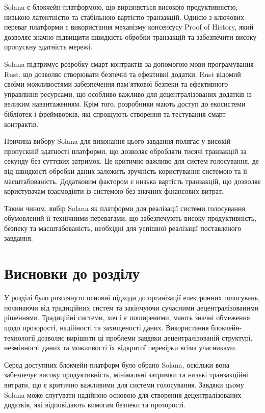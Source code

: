 \documentclass[14pt]{extreport}
\begin{document}
  Solana є блокчейн-платформою, що вирізняється високою продуктивністю, низькою латентністю та стабільною вартістю транзакцій. Однією з ключових переваг платформи є використання механізму консенсусу Proof of History, який дозволяє значно підвищити швидкість обробки транзакцій та забезпечити високу пропускну здатність мережі.

  Solana підтримує розробку смарт-контрактів за допомогою мови програмування Rust, що дозволяє створювати безпечні та ефективні додатки. Rust відомий своїми можливостями забезпечення пам’яткової безпеки та ефективного управління ресурсами, що особливо важливо для децентралізованих додатків із великим навантаженням. Крім того, розробники мають доступ до екосистеми бібліотек і фреймворків, які спрощують створення та тестування смарт-контрактів.

  Причина вибору Solana для виконання цього завдання полягає у високій пропускній здатності платформи, що дозволяє обробляти тисячі транзакцій за секунду без суттєвих затримок. Це критично важливо для систем голосування, де від швидкості обробки даних залежить зручність користування системою та її масштабованість. Додатковим фактором є низька вартість транзакцій, що дозволяє користувачам взаємодіяти із системою без значних фінансових витрат.

  Таким чином, вибір Solana як платформи для реалізації системи голосування обумовлений її технічними перевагами, що забезпечують високу продуктивність, безпеку та масштабованість, необхідні для успішної реалізації поставленого завдання.
  
  \section{Висновки до розділу}
  
  У розділі було розглянуто основні підходи до організації електронних голосувань, починаючи від традиційних систем та закінчуючи сучасними децентралізованими рішеннями. Традиційні системи, хоч і є поширеними, мають значні обмеження щодо прозорості, надійності та захищеності даних. Використання блокчейн-технології дозволяє вирішити ці проблеми завдяки децентралізованій структурі, незмінності даних та можливості їх відкритої перевірки всіма учасниками.

  Серед доступних блокчейн-платформ було обрано Solana, оскільки вона забезпечує високу продуктивність, мінімальні затримки та низькі транзакційні витрати, що є критично важливими для системи голосування. Завдяки цьому Solana може слугувати надійною основою для створення децентралізованих додатків, які відповідають вимогам безпеки та прозорості.
\end{document}
